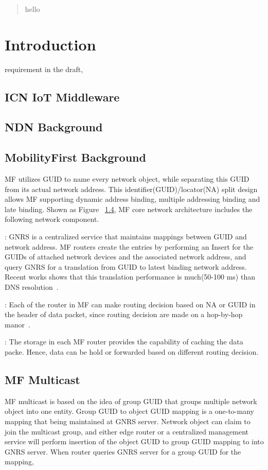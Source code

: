 \begin{abstract}
hello
\end{abstract}

\section{Introduction}
requirement in the draft,
\subsection{ICN IoT Middleware}
\subsection{NDN Background}
\subsection{MobilityFirst Background}
MF utilizes GUID to name every network object, while separating this GUID from its actual network address. This identifier(GUID)/locator(NA) split design allows MF supporting dynamic address binding, multiple addressing binding and late binding. Shown as Figure ~\ref{}, MF core network architecture includes the following network component.

\vspace{1mm}: GNRS is a centralized service that maintains mappings between GUID and network address. MF routers create the entries by performing an Insert for the GUIDs of attached network devices and the associated network address, and query GNRS for a translation from GUID to latest binding network address. Recent works shows that this translation performance is much(50-100 ms) than DNS resolution~\cite{vu2012dmap}.

\vspace{1mm}: Each of the router in MF can make routing decision based on NA or GUID in the header of data packet, since routing decision are made on a hop-by-hop manor~\cite{nelson2011gstar}.

\vspace{1mm}: The storage in each MF router provides the capability of caching the data packe. Hence, data can be hold or forwarded based on different routing decision.
\subsection{MF Multicast}
MF multicast is based on the idea of group GUID that groups multiple network object into one entity. Group GUID  to object GUID mapping is a one-to-many mapping that being maintained at GNRS server. Network object can claim to join the multicast group, and either edge router or a centralized management service will perform insertion of the object GUID to group GUID mapping to into GNRS server. When router queries GNRS server for a group GUID for the mapping, 
